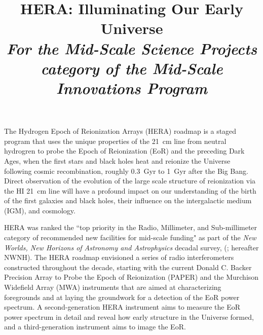 \documentclass[preprint]{aastex}
\def\HI{{H{\small I }}}
\begin{document}
\title{HERA: Illuminating Our Early Universe\\
{\it For the Mid-Scale Science Projects category of the Mid-Scale Innovations Program}} 



{ \setlength{\parindent}{0cm}
The Hydrogen Epoch of Reionization Arrays (HERA) roadmap is a staged
program that uses the unique properties of the 21~cm line from neutral
hydrogren to probe the 
Epoch of Reionization (EoR) and the preceding Dark Ages,
when the first stars and black holes heat and reionize the
Universe following cosmic recombination, roughly
0.3~Gyr to 1~Gyr after the Big Bang. Direct observation of the evolution of the
large scale structure of reionization via the \HI 21~cm line will have a profound impact on our
understanding of the birth of the first galaxies and black holes, their
influence on the intergalactic medium (IGM), and cosmology.}  

HERA was ranked the ``top priority in the Radio, Millimeter, and Sub-millimeter
category of recommended new facilities for mid-scale funding" as part of the
{\it New Worlds, New Horizons of Astronomy and Astrophysics} decadal survey,
(\citealt{astro2010}; hereafter NWNH).  
The HERA roadmap envisioned a series of
radio interferometers constructed throughout the decade, starting with the current
Donald C. Backer Precision Array to Probe the Epoch of Reionization (PAPER) and 
the Murchison Widefield Array (MWA) instruments 
that are aimed at characterizing
foregrounds and at laying the groundwork for a detection of the EoR power
spectrum. A second-generation HERA instrument aims to measure the EoR power spectrum in
detail and reveal how early structure in the Universe formed, and a
third-generation instrument aims to image the EoR. 
\end{document}
